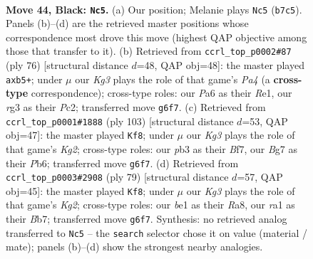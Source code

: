 \documentclass[11pt]{article}
\begin{document}
\clearpage

\begin{figure}[p]\centering
\begin{subfigure}{0.46\textwidth}\centering
\resizebox{\linewidth}{!}{%
\newchessgame
\chessboard[
  setfen={1rr5/1n4bp/p2p2k1/P3p1Pp/1pP1P3/1P3PR1/2K3B1/R3B3 b - - 3 44},
  showmover=false,
  pgfstyle=straightmove, color=movearrow, markmove={b7-c5}
]}
\caption{}
\end{subfigure}\hfill
\begin{subfigure}{0.46\textwidth}\centering
\resizebox{\linewidth}{!}{%
\newchessgame
\chessboard[
  setfen={3br1n1/2p2r2/p1k5/1pp1Pp2/P6p/2N4P/1PP3PB/4RR1K w - - 1 39},
  showmover=false,
  pgfstyle=straightmove, color=movearrow, markmove={a4-b5}
]}
\caption{}
\end{subfigure}
\\[4pt]
\begin{subfigure}{0.46\textwidth}\centering
\resizebox{\linewidth}{!}{%
\newchessgame
\chessboard[
  setfen={2rr4/5bk1/1p1ppp2/7p/PpP1P1pn/1P1B4/2NR1PP1/3R2K1 b - - 5 52},
  showmover=false,
  pgfstyle=straightmove, color=movearrow, markmove={g7-f8}
]}
\caption{}
\end{subfigure}\hfill
\begin{subfigure}{0.46\textwidth}\centering
\resizebox{\linewidth}{!}{%
\newchessgame
\chessboard[
  setfen={r7/1b3pk1/1p4r1/1B1p3p/P1pPp2P/4P3/PR3PP1/2R3K1 b - - 0 40},
  showmover=false,
  pgfstyle=straightmove, color=movearrow, markmove={g7-f8}
]}
\caption{}
\end{subfigure}
\caption{\textbf{Move 44, Black: \texttt{Nc5}.} (a) Our position; Melanie plays \texttt{Nc5} (\texttt{b7c5}). Panels (b)--(d) are the retrieved master positions whose correspondence most drove this move (highest QAP objective among those that transfer to it). (b) Retrieved from \texttt{ccrl\_top\_p0002\#87} (ply 76) [structural distance $d$=48, QAP obj=48]: the master played \texttt{axb5+}; under $\mu$ our \emph{Kg3} plays the role of that game's \emph{Pa4} (a \textbf{cross-type} correspondence); cross-type roles: our \emph{P}a6 as their \emph{R}e1, our \emph{r}g3 as their \emph{P}c2; transferred move \texttt{g6f7}. (c) Retrieved from \texttt{ccrl\_top\_p0001\#1888} (ply 103) [structural distance $d$=53, QAP obj=47]: the master played \texttt{Kf8}; under $\mu$ our \emph{Kg3} plays the role of that game's \emph{Kg2}; cross-type roles: our \emph{p}b3 as their \emph{B}f7, our \emph{B}g7 as their \emph{P}b6; transferred move \texttt{g6f7}. (d) Retrieved from \texttt{ccrl\_top\_p0003\#2908} (ply 79) [structural distance $d$=57, QAP obj=45]: the master played \texttt{Kf8}; under $\mu$ our \emph{Kg3} plays the role of that game's \emph{Kg2}; cross-type roles: our \emph{b}e1 as their \emph{R}a8, our \emph{r}a1 as their \emph{B}b7; transferred move \texttt{g6f7}. Synthesis: no retrieved analog transferred to \texttt{Nc5} -- the \texttt{search} selector chose it on value (material / mate); panels (b)--(d) show the strongest nearby analogies.}
\label{fig:thought-m87}
\end{figure}
\end{document}
